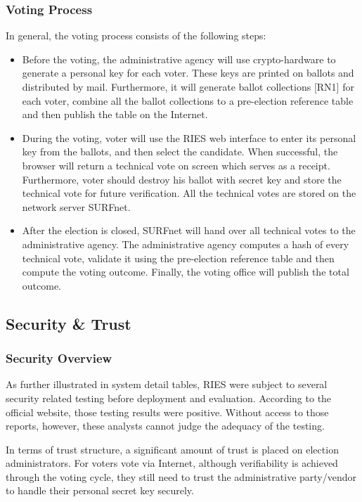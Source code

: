 \subsubsection{Voting Process}

In general, the voting process consists of the following steps:

\begin{itemize}
\item Before the voting, the administrative agency will use crypto-hardware to generate a personal key for each voter. These keys are printed on ballots and distributed by mail. Furthermore, it will generate ballot collections [RN1] for each voter, combine all the ballot collections to a pre-election reference table and then publish the table on the Internet.
\item During the voting, voter will use the RIES web interface to enter its personal key from the ballots, and then select the candidate. When successful, the browser will return a technical vote on screen which serves as a receipt. Furthermore, voter should destroy his ballot with secret key and store the technical vote for future verification. All the technical votes are stored on the network server SURFnet.
\item After the election is closed, SURFnet will hand over all technical votes to the administrative agency. The administrative agency computes a hash of every technical vote, validate it using the pre-election reference table and then compute the voting outcome. Finally, the voting office will publish the total outcome.
\end{itemize}

\subsection{Security \& Trust}

\subsubsection{Security Overview}

As further illustrated in system detail tables, RIES were subject to several security related testing before deployment and evaluation. According to the official website, those testing results were positive. Without access to those reports, however, these analysts cannot judge the adequacy of the testing.

In terms of trust structure, a significant amount of trust is placed on election administrators. For voters vote via Internet, although verifiability is achieved through the voting cycle, they still need to trust the administrative party/vendor to handle their personal secret key securely.

